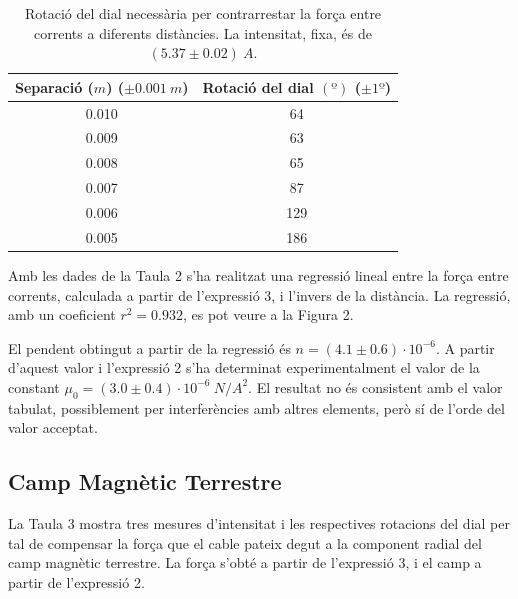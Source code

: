 \documentclass[a4paper,11pt]{article}
\begin{document}
\begin{table}
	\centering
	\caption{Rotació del dial necessària per contrarrestar la força entre corrents a diferents distàncies. La intensitat, fixa, és de $(5.37\pm0.02)\ \si{A}$.}
	\vspace{0.5cm}
	\begin{tabular}{|c|c|}
		\hline
		\textbf{Separació ($\si{m}$) ($\pm 0.001\ \si{m}$)}&\textbf{Rotació del dial} $\si{(º)}$ ($\pm 1º$) \\ \hline
		0.010 & 64  \\ \hline
		0.009 & 63  \\ \hline 
		0.008 & 65 \\ \hline 
		0.007 & 87  \\ \hline 
		0.006 & 129  \\ \hline  
		0.005 & 186  \\ \hline  
	\end{tabular}
\end{table}
Amb les dades de la Taula 2 s'ha realitzat una regressió lineal entre la força entre corrents, calculada a partir de l'expressió 3, i l'invers de la distància. La regressió, amb un coeficient $r^2=0.932$, es pot veure a la Figura 2.

El pendent obtingut a partir de la regressió és $n=(4.1\pm0.6)\cdot10^{-6}$. A partir d'aquest valor i l'expressió 2 s'ha determinat experimentalment el valor de la constant $\mu_0=(3.0\pm0.4)\cdot10^{-6}\ \si{N/A^2}$. El resultat no és consistent amb el valor tabulat, possiblement per interferències amb altres elements, però sí de l'orde del valor acceptat.

\subsection{Camp Magnètic Terrestre}
La Taula 3 mostra tres mesures d'intensitat i les respectives rotacions del dial per tal de compensar la força que el cable pateix degut a la component radial del camp magnètic terrestre. La força s'obté a partir de l'expressió 3, i el camp a partir de l'expressió 2.
\end{document}
